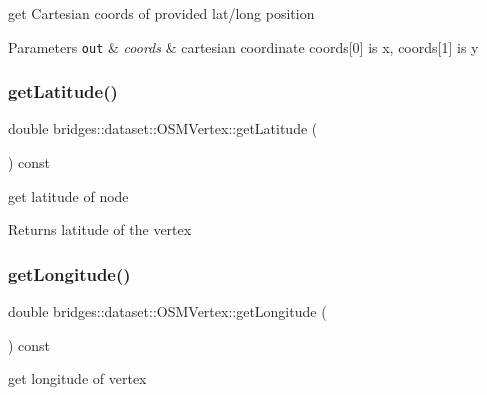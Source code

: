 get Cartesian coords of provided lat/long position


\begin{DoxyParams}[1]{Parameters}
\mbox{\tt out}  & {\em coords} & cartesian coordinate coords\mbox{[}0\mbox{]} is x, coords\mbox{[}1\mbox{]} is y \\
\hline
\end{DoxyParams}
\mbox{\label{classbridges_1_1dataset_1_1_o_s_m_vertex_a1f41a5f01d68747ee04b5c5eaa629c6e}} 
\subsubsection{\texorpdfstring{get\+Latitude()}{getLatitude()}}
{\footnotesize\ttfamily double bridges\+::dataset\+::\+O\+S\+M\+Vertex\+::get\+Latitude (\begin{DoxyParamCaption}{ }\end{DoxyParamCaption}) const\hspace{0.3cm}{\ttfamily [inline]}}

get latitude of node

\begin{DoxyReturn}{Returns}
latitude of the vertex 
\end{DoxyReturn}
\mbox{\label{classbridges_1_1dataset_1_1_o_s_m_vertex_a98e17875d886a63ed73a6f77cc26686d}} 
\subsubsection{\texorpdfstring{get\+Longitude()}{getLongitude()}}
{\footnotesize\ttfamily double bridges\+::dataset\+::\+O\+S\+M\+Vertex\+::get\+Longitude (\begin{DoxyParamCaption}{ }\end{DoxyParamCaption}) const\hspace{0.3cm}{\ttfamily [inline]}}

get longitude of vertex

